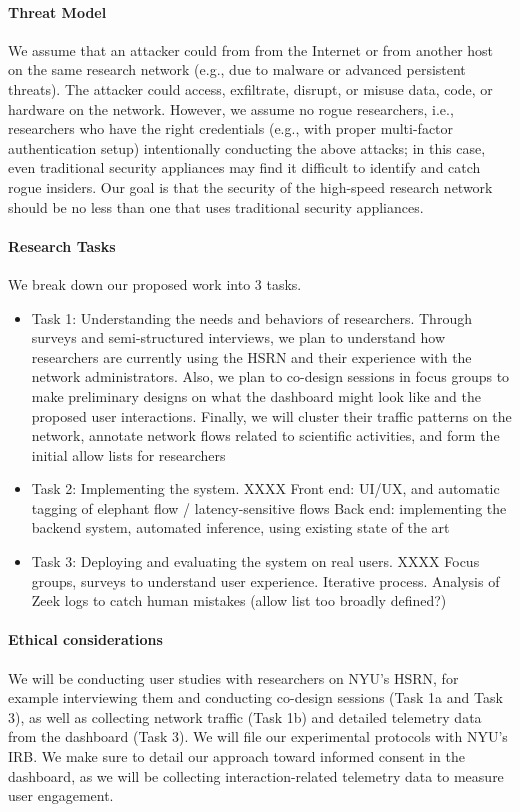 \paragraph{Threat Model}
We assume that an attacker could from from the Internet or from another host on the same research network (e.g., due to malware or advanced persistent threats). The attacker could access, exfiltrate, disrupt, or misuse data, code, or hardware on the network. However, we assume no rogue researchers, i.e., researchers who have the right credentials (e.g., with proper multi-factor authentication setup) intentionally conducting the above attacks; in this case, even traditional security appliances may find it difficult to identify and catch rogue insiders. Our goal is that the security of the high-speed research network should be no less than one that uses traditional security appliances.


\paragraph{Research Tasks}
We break down our proposed work into 3 tasks.

\begin{itemize}
    \item Task 1: Understanding the needs and behaviors of researchers.
    Through surveys and semi-structured interviews, we plan to understand how researchers are currently using the HSRN and their experience with the network administrators. Also, we plan to co-design sessions in focus groups to make preliminary designs on what the dashboard might look like and the proposed user interactions.
    Finally, we will cluster their traffic patterns on the network, annotate network flows related to scientific activities, and form the initial allow lists for researchers
    \item Task 2: Implementing the system. XXXX
    Front end: UI/UX, and automatic tagging of elephant flow / latency-sensitive flows
    Back end: implementing the backend system, automated inference, using existing state of the art
    \item Task 3: Deploying and evaluating the system on real users. XXXX
    Focus groups, surveys to understand user experience. Iterative process.
    Analysis of Zeek logs to catch human mistakes (allow list too broadly defined?)
\end{itemize}



\paragraph{Ethical considerations}
We will be conducting user studies with researchers on NYU's HSRN, for example interviewing them and conducting co-design sessions (Task 1a and Task 3), as well as collecting network traffic (Task 1b) and detailed telemetry data from the dashboard (Task 3). We will file our experimental protocols with NYU's IRB. We make sure to detail our approach toward informed consent in the dashboard, as we will be collecting interaction-related telemetry data to measure user engagement.

